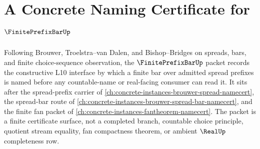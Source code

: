 \chapter{A Concrete Naming Certificate for $\FinitePrefixBarUp$}
\label{ch:concrete-instances-finite-prefix-bar-namecert}

Following Brouwer, Troelstra--van Dalen, and Bishop--Bridges on spreads, bars, and finite choice-sequence observation, the $\FinitePrefixBarUp$ packet records the constructive L10 interface by which a finite bar over admitted spread prefixes is named before any countable-name or real-facing consumer can read it. It sits after the spread-prefix carrier of \autoref{ch:concrete-instances-brouwer-spread-namecert}, the spread-bar route of \autoref{ch:concrete-instances-brouwer-spread-bar-namecert}, and the finite fan packet of \autoref{ch:concrete-instances-fantheorem-namecert}. The packet is a finite certificate surface, not a completed branch, countable choice principle, quotient stream equality, fan compactness theorem, or ambient $\RealUp$ completeness row.

